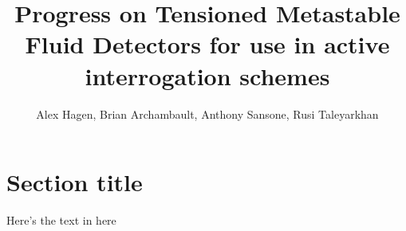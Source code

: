 

\title{Progress on Tensioned Metastable Fluid Detectors for use in active
       interrogation schemes}
\author{Alex Hagen, Brian Archambault,
        Anthony Sansone, Rusi Taleyarkhan}
\renewcommand{\today}{November 2, 1994}
\maketitle
\twocol

\section{Section title}{Here's the text in here}


